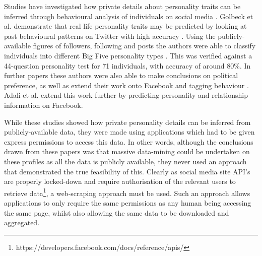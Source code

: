 Studies have investigated how private details about personality traits can be inferred through behavioural analysis of individuals on social media \cite{adali2012predicting,adali2012actions,bachrach2012personality,golbeck2011predicting,golbeck2011computing,golbeck2011,golbeck2011experimental}. Golbeck et al. demonstrate that real life personality traits may be predicted by looking at past behavioural patterns on Twitter with high accuracy \cite{golbeck2011predicting}. Using the publicly-available figures of followers, following and posts the authors were able to classify individuals into different Big Five personality types \cite{de2000big}. This was verified against a 44-question personality test for 71 individuals, with accuracy of around 80\%. In further papers these authors were also able to make conclusions on political preference, as well as extend their work onto Facebook and tagging behaviour \cite{golbeck2011computing,golbeck2011,golbeck2011experimental}. Adali et al. \cite{adali2012predicting,
adali2012actions} extend this work further by predicting personality and relationship information on Facebook.

While these studies showed how private personality details can be inferred from publicly-available data, they were made using applications which had to be given express permissions to access this data. In other words, although the conclusions drawn from these papers was that massive data-mining could be undertaken on these profiles as all the data is publicly available, they never used an approach that demonstrated the true feasibility of this. Clearly as social media site API's are properly locked-down and require authorisation of the relevant users to retrieve data\footnote{https://developers.facebook.com/docs/reference/apis/}, a web-scraping approach must be used. Such an approach allows applications to only require the same permissions as any human being accessing the same page, whilst also allowing the same data to be downloaded and aggregated.

